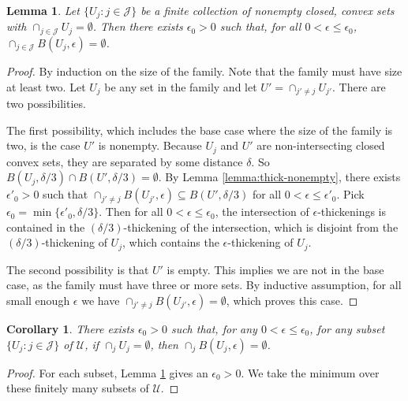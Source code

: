 \documentclass[11pt]{article}
\newcommand{\U}{\mathcal{U}}
\newtheorem{lemma}{Lemma}
\newtheorem{corollary}{Corollary}
\begin{document}
\begin{lemma} \label{lemma:thick-empty}
  Let $\{U_j : j \in \mathcal{J}\}$ be a finite collection of nonempty closed, convex sets with $\cap_{j\in\mathcal{J}} U_j = \emptyset$.
  Then there exists  $\epsilon_0 > 0$ such that, for all $0 < \epsilon \leq \epsilon_0$, $\cap_{j\in\mathcal{J}} B(U_j,\epsilon) = \emptyset$.
\end{lemma}
\begin{proof}
  By induction on the size of the family.
  Note that the family must have size at least two.
  Let $U_j$ be any set in the family and let $U' = \cap_{j' \neq j} U_{j'}$.
  There are two possibilities.

  The first possibility, which includes the base case where the size of the family is two, is the case $U'$ is nonempty.
  Because $U_j$ and $U'$ are non-intersecting closed convex sets, they are separated by some distance $\delta$.
  So $B(U_j, \delta/3) \cap B(U', \delta/3) = \emptyset$.
  By Lemma \ref{lemma:thick-nonempty}, there exists $\epsilon'_0 > 0$ such that $\cap_{j'\neq j} B(U_{j'},\epsilon) \subseteq B(U', \delta/3)$ for all $0 < \epsilon \leq \epsilon'_0$.
  Pick $\epsilon_0 = \min\{\epsilon'_0,\delta/3\}$.
  Then for all $0 < \epsilon \leq \epsilon_0$, the intersection of $\epsilon$-thickenings is contained in the $(\delta/3)$-thickening of the intersection, which is disjoint from the $(\delta/3)$-thickening of $U_j$, which contains the $\epsilon$-thickening of $U_j$.

  The second possibility is that $U'$ is empty.
  This implies we are not in the base case, as the family must have three or more sets.
  By inductive assumption, for all small enough $\epsilon$ we have $\cap_{j' \neq j} B(U_{j'},\epsilon) = \emptyset$, which proves this case.
\end{proof}


\begin{corollary} \label{cor:thick-intersect}
  There exists $\epsilon_0 > 0$ such that, for any $0 < \epsilon \leq \epsilon_0$, for any subset $\{U_j : j \in \mathcal{J}\}$ of $\U$, if $\cap_j U_j = \emptyset$, then $\cap_j B(U_j,\epsilon) = \emptyset$.
\end{corollary}
\begin{proof}
  For each subset, Lemma \ref{lemma:thick-empty} gives an $\epsilon_0 > 0$.
  We take the minimum over these finitely many subsets of $\U$.
\end{proof}
\end{document}
